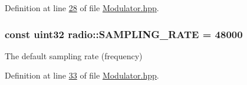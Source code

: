 Definition at line \hyperlink{Modulator_8hpp_source_l00028}{28} of file \hyperlink{Modulator_8hpp_source}{Modulator.\+hpp}.

\hypertarget{namespaceradio_a284213fea4beed2f74bb936927cbe654}{
\subsubsection[{S\+A\+M\+P\+L\+I\+N\+G\+\_\+\+R\+A\+T\+E}]{\setlength{\rightskip}{0pt plus 5cm}const {\bf uint32} radio\+::\+S\+A\+M\+P\+L\+I\+N\+G\+\_\+\+R\+A\+T\+E = 48000}}\label{namespaceradio_a284213fea4beed2f74bb936927cbe654}
The default sampling rate (frequency) 

Definition at line \hyperlink{Modulator_8hpp_source_l00033}{33} of file \hyperlink{Modulator_8hpp_source}{Modulator.\+hpp}.

